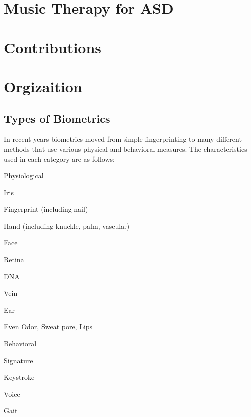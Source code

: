 \section{Music Therapy for ASD}

\section{Contributions}


\section{Orgizaition}





\subsection{Types of Biometrics} In recent years biometrics moved from simple fingerprinting to many different methods that use
various physical and behavioral measures. The characteristics used
in each category are as follows:

\bi \item Physiological
    \bi
        \item Iris
        \item Fingerprint (including nail)
        \item Hand (including knuckle, palm, vascular)
        \item Face
        \item Retina
        \item DNA
        \item Vein
        \item Ear
        \item Even Odor, Sweat pore, Lips
    \ei
\item Behavioral
    \bi
        \item Signature
        \item Keystroke
        \item Voice
        \item Gait
    \ei
\ei




